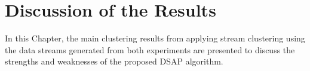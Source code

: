 \setlength{\parindent}{2em}






% 
\chapter{Discussion of the Results}

In this Chapter, the main clustering results from applying stream clustering using the data streams generated from both experiments are presented to discuss the strengths and weaknesses of the proposed DSAP algorithm. 

